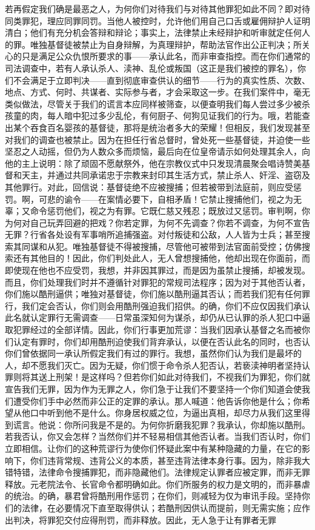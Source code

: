 若再假定我们确是最恶之人，为何你们对待我们与对待其他罪犯如此不同？即对待同类罪犯，理应同罪同罚。当他人被控时，允许他们用自己口舌或雇佣辩护人证明清白；他们有充分机会答辩和辩论；事实上，法律禁止未经辩护和听审就定任何人的罪。唯独基督徒被禁止为自身辩解，为真理辩护，帮助法官作出公正判决；所关心的只是满足公众仇恨所要求的事——承认此名，而非审查指控。而在你们通常的司法调查中，若有人承认杀人、渎神、乱伦或叛国（这正是我们被控的罪名），你们不会满足于立即判决——直到彻底审查供认的细节——行为的真实性质、次数、地点、方式、何时、共谋者、实际参与者，才会采取这一步。在我们案件中，毫无类似做法，尽管关于我们的谎言本应同样被筛查，以便查明我们每人尝过多少被杀孩童的肉，每人暗中犯过多少乱伦，有何厨子、何狗见证我们的行为。哦，若能查出某个吞食百名婴孩的基督徒，那将是统治者多大的荣耀！但相反，我们发现甚至对我们的调查也被禁止。因为在担任行省总督时，曾处死一些基督徒，并迫使一些坚忍之人动摇，但仍为人数众多而烦恼，最后向在位皇帝请示如何处理其余人，向他的主上说明：除了顽固不愿献祭外，他在宗教仪式中只发现清晨聚会唱诗赞美基督和天主，并通过共同承诺忠于宗教来封印其生活方式，禁止杀人、奸淫、盗窃及其他罪行。对此，回信说：基督徒绝不应被搜捕；但若被带到法庭前，则应受惩罚。啊，可悲的谕令——在案情必要下，自相矛盾！它禁止搜捕他们，视之为无辜；又命令惩罚他们，视之为有罪。它既仁慈又残忍；既放过又惩罚。审判啊，你为何对自己玩弄回避的把戏？你若定罪，为何不先调查？你若不调查，为何不宣告无罪？行省各处设有军事哨所追捕强盗。对付叛徒和公敌，人人皆为士兵；甚至搜索其同谋和从犯。唯独基督徒不得被搜捕，尽管他可被带到法官面前受控；仿佛搜索还有其他目的！因此，你们判处此人，无人曾想搜捕他，他却出现在你面前，而即使现在他也不应受罚，我想，并非因其罪过，而是因为虽禁止搜捕，却被发现。而且，你们处理我们时并不遵循针对罪犯的常规司法程序；因为对于其他否认者，你们施以酷刑逼供；唯独对基督徒，你们施以酷刑逼其否认；而若我们犯有任何罪行，我们定会否认，你们则会用酷刑强迫我们招供。的确，你们不应仅因我们承认此名就认定罪行无需调查——日常虽深知何为谋杀，却仍从已认罪的杀人犯口中逼取犯罪经过的全部详情。因此，你们行事更加荒谬：当我们因承认基督之名而被你们认定有罪时，你们却用酷刑迫使我们背弃承认，以便在否认此名的同时，也否认你们曾依据同一承认所假定我们有过的罪行。我想，虽然你们认为我们是最坏的人，却不愿我们灭亡。因为无疑，你们惯于命令杀人犯否认，若亵渎神明者坚持认罪则将其送上刑架！是这样吗？但若你们如此对待我们，不视我们为罪犯，你们就宣告我们无罪，因为作为无罪之人，你们急于让我们不要坚持一个你们知道会使我们遭受你们手中必然而非公正的定罪的承认。那人喊道：他告诉你他是什么；你希望从他口中听到他不是什么。你身居权威之位，为逼出真相，却尽力从我们这里得到谎言。他说：你所问我是不是的。为何你折磨我犯罪？我承认，你却施以酷刑。若我否认，你又会怎样？当然你们并不轻易相信其他否认者。当我们否认时，你们立即相信。让你们的这种荒谬行为使你们怀疑此案中有某种隐藏的力量，在它的影响下，你们违背常规、违背公义的本质，甚至违背法律本身行事。因为，除非我大错特错，法律命令搜捕罪犯，而非隐藏他们。法律规定认罪者应被定罪，而非无罪释放。元老院法令、长官命令都明确如此。你们所服务的权力是文明的，而非暴虐的统治。的确，暴君曾将酷刑用作惩罚；在你们，则减轻为仅为审讯手段。坚持你们的法律，在必要情况下直至取得供认；若酷刑因供认而提前，则无需实施；应作出判决，将罪犯交付应得刑罚，而非释放。因此，无人急于让有罪者无罪